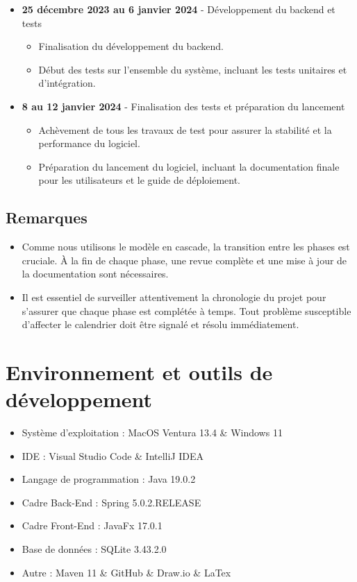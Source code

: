 \documentclass{article}
\begin{document}
\begin{itemize}
    \item \textbf{25 décembre 2023 au 6 janvier 2024} - Développement du backend et tests
    \begin{itemize}
        \item Finalisation du développement du backend.
        \item Début des tests sur l'ensemble du système, incluant les tests unitaires et d'intégration.
    \end{itemize}

    \item \textbf{8 au 12 janvier 2024} - Finalisation des tests et préparation du lancement
    \begin{itemize}
        \item Achèvement de tous les travaux de test pour assurer la stabilité et la performance du logiciel.
        \item Préparation du lancement du logiciel, incluant la documentation finale pour les utilisateurs et le guide de déploiement.
    \end{itemize}
\end{itemize}

\subsection{Remarques}

\begin{itemize}
    \item Comme nous utilisons le modèle en cascade, la transition entre les phases est cruciale. À la fin de chaque phase, une revue complète et une mise à jour de la documentation sont nécessaires.
    \item Il est essentiel de surveiller attentivement la chronologie du projet pour s'assurer que chaque phase est complétée à temps. Tout problème susceptible d'affecter le calendrier doit être signalé et résolu immédiatement.
\end{itemize}

\section{Environnement et outils de développement}
\begin{itemize}
    \item Système d'exploitation : MacOS Ventura 13.4 \& Windows 11
    \item IDE : Visual Studio Code \& IntelliJ IDEA
    \item Langage de programmation : Java 19.0.2
    \item Cadre Back-End : Spring 5.0.2.RELEASE
    \item Cadre Front-End : JavaFx 17.0.1
    \item Base de données : SQLite 3.43.2.0
    \item Autre : Maven 11 \& GitHub \& Draw.io \& LaTex
\end{itemize}
\end{document}
